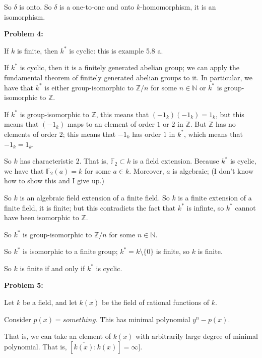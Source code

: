 \documentclass[a4paper,12pt]{article}
\newcommand{\shunt}{\vspace{20mm}}
\newcommand{\de}{\delta}
\newcommand{\N}{\mathbb{N}}
\newcommand{\Q}{\mathbb{Q}}
\newcommand{\Z}{\mathbb{Z}}
\begin{document}
So $\de$ is onto. So $\de$ is a one-to-one and onto $k$-homomorphism, it is an isomorphism.

\shunt

{\bf Problem 4:} 

If $k$ is finite, then $k^*$ is cyclic: this is example 5.8 a.

If $k^*$ is cyclic, then it is a finitely generated abelian group; we can apply the fundamental theorem of finitely generated abelian groups to it. In particular, we have that $k^*$ is either group-isomorphic to $\Z/n$ for some $n \in \N$ or $k^*$ is group-isomorphic to $\Z$.

If $k^*$ is group-isomorphic to $\Z$, this means that $(-1_k)(-1_k) = 1_k$, but this means that $(-1_k)$ maps to an element of order $1$ or $2$ in $\Z$. But $\Z$ has no elements of order $2$; this means that $-1_k$ has order $1$ in $k^*$, which means that $-1_k=1_k$. 

So $k$ has characteristic $2$. That is, $\mathbb{F}_2 \subset k$ is a field extension. Because $k^*$ is cyclic, we have that $\mathbb{F}_2(a) = k$ for some $a \in k$. Moreover, $a$ is algebraic; (I don't know how to show this and I give up.)

So $k$ is an algebraic field extension of a finite field. So $k$ is a finite extension of a finite field, it is finite; but this contradicts the fact that $k^*$ is infinte, so $k^*$ cannot have been isomorphic to $\Z$.

So $k^*$ is group-isomorphic to $\Z/n$ for some $n \in \N$.

So $k^*$ is isomorphic to a finite group; $k^* = k \setminus \{0\}$ is finite, so $k$ is finite.

So $k$ is finite if and only if $k^*$ is cyclic.

\shunt

{\bf Problem 5:} 

Let $k$ be a field, and let $k(x)$ be the field of rational functions of $k$.

Consider $p(x)= something$. This has minimal polynomial $y^n - p(x)$.

That is, we can take an element of $k(x)$ with arbitrarily large degree of minimal polynomial. That is, $[\overline{k(x)}: k(x)] = \infty]$.


\shunt
\end{document}
